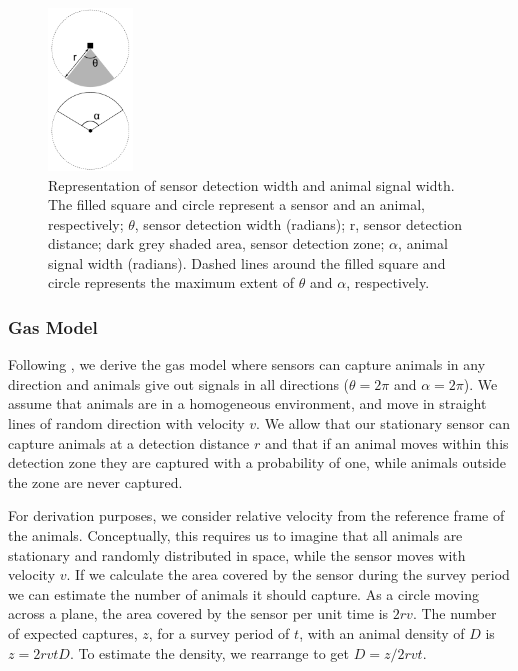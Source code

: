 \documentclass[a4paper,10pt,reqno,oneside]{amsart}
\begin{document}
\begin{figure}[t]
        \centering
	\includegraphics[width=0.2\textwidth]{imgs/angleDefinitions.pdf}

\caption{Representation of sensor detection width and animal signal width. The filled square and circle represent a sensor and an animal, respectively; $\theta$, sensor detection width (radians); r, sensor detection distance; dark grey shaded area, sensor detection zone; $\alpha$, animal signal width (radians). Dashed lines around the filled square and circle represents the maximum extent of $\theta$ and $\alpha$, respectively.} %
\label{f:AngleDef}
\end{figure}



\subsubsection{Gas Model}

Following \cite{yapp1956theory}, we derive the gas model where sensors can capture animals in any direction and animals give out signals in all directions ($ \theta =  2\pi$ and $ \alpha =  2\pi$). We assume that animals are in a homogeneous environment, and move in straight lines of random direction with velocity $v$. We allow that our stationary sensor can capture animals at a detection distance $r$ and that if an animal moves within this detection zone they are captured with a probability of one, while animals outside the zone are never captured.

For derivation purposes, we consider relative velocity from the reference frame of the animals. Conceptually, this requires us to imagine that all animals are stationary and randomly distributed in space, while the sensor moves with velocity $v$. If we calculate the area covered by the sensor during the survey period we can estimate the number of animals it should capture. As a circle moving across a plane, the area covered by the sensor per unit time is $2rv$. The number of expected captures, $z$, for a survey period of $t$, with an animal density of $D$ is $z = 2rvtD$. To estimate the density, we rearrange to get $D = z/2rvt$.
\end{document}

